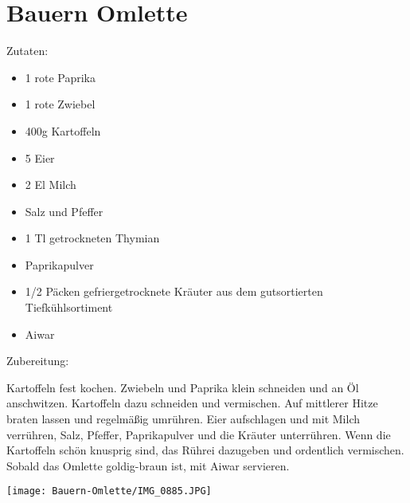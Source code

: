 \section{Bauern Omlette}
Zutaten:
\begin{itemize}
    \item 1 rote Paprika
    \item 1 rote Zwiebel
    \item 400g Kartoffeln
    \item 5 Eier
    \item 2 El Milch
    \item Salz und Pfeffer
    \item 1 Tl getrockneten Thymian
    \item Paprikapulver
    \item 1/2 Päcken gefriergetrocknete Kräuter aus dem gutsortierten Tiefkühlsortiment
    \item Aiwar
\end{itemize}

\noindent Zubereitung:

\noindent Kartoffeln fest kochen. Zwiebeln und Paprika klein schneiden und an Öl anschwitzen. Kartoffeln dazu schneiden und vermischen. Auf mittlerer Hitze braten lassen und regelmäßig umrühren. Eier aufschlagen und mit Milch verrühren, Salz, Pfeffer, Paprikapulver und die Kräuter unterrühren. Wenn die Kartoffeln schön knusprig sind, das Rührei dazugeben und ordentlich vermischen. Sobald das Omlette goldig-braun ist, mit Aiwar servieren.

\newpage
\mbox{}
\vfill
\begin{center}
    \texttt{[image: Bauern-Omlette/IMG\_0885.JPG]}
\end{center}
\vfill
\mbox{ }
\newpage
